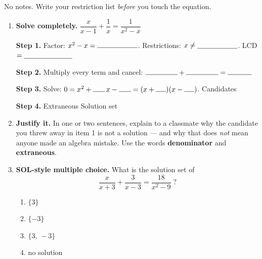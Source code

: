 \documentclass[10pt]{article}
\begin{document}
\namedateperiod

\vspace{0.06in}

No notes. Write your restriction list \emph{before} you touch the equation.

\vspace{0.04in}

\begin{enumerate}[leftmargin=1.8em, itemsep=9pt]
  \item \textbf{Solve completely.} \; $\dfrac{x}{x-1}+\dfrac{1}{x}=\dfrac{1}{x^2-x}$

        \vspace{3pt}
        \textbf{Step 1.} Factor: $x^2-x=\rule{2.0cm}{0.4pt}$. \; Restrictions: $x\neq\blank{2.0cm}$.
        \; LCD $=\blank{2.4cm}$

        \vspace{3pt}
        \textbf{Step 2.} Multiply every term and cancel:
        \; $\rule{1.6cm}{0.4pt}+\rule{1.6cm}{0.4pt}=\rule{1.2cm}{0.4pt}$

        \vspace{3pt}
        \textbf{Step 3.} Solve: $0=x^2+\rule{0.6cm}{0.4pt}\,x-\rule{0.6cm}{0.4pt}
        =(x+\rule{0.5cm}{0.4pt})(x-\rule{0.5cm}{0.4pt})$. \; Candidates \blank{2.2cm}

        \vspace{3pt}
        \textbf{Step 4.} Extraneous \blank{1.2cm} \quad Solution set \blank{2.0cm}

  \item \textbf{Justify it.} In one or two sentences, explain to a classmate why the candidate you threw
        away in item 1 is not a solution --- and why that does \emph{not} mean anyone made an algebra
        mistake. Use the words \textbf{denominator} and \textbf{extraneous}.

  \item \textbf{SOL-style multiple choice.} What is the solution set of
        \[ \frac{x}{x+3}+\frac{3}{x-3}=\frac{18}{x^2-9}\;? \]
        \vspace{-8pt}
        \begin{enumerate}[label=\Alph*., leftmargin=1.9em, itemsep=1pt]
          \item $\{3\}$
          \item $\{-3\}$
          \item $\{3,\,-3\}$
          \item no solution
        \end{enumerate}
\end{enumerate}
\end{document}
